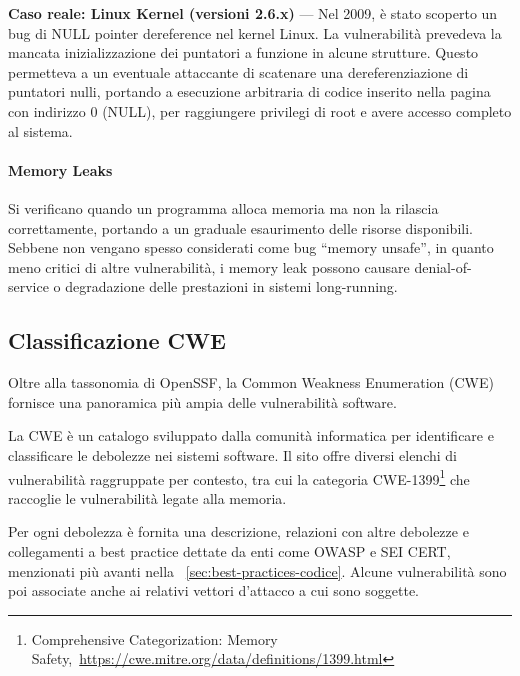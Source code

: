 \textbf{Caso reale: Linux Kernel (versioni 2.6.x)} — Nel 2009, è stato scoperto
un bug di NULL pointer dereference nel kernel Linux. La vulnerabilità prevedeva la
mancata inizializzazione dei puntatori a funzione in alcune strutture. Questo
permetteva a un eventuale attaccante di scatenare una dereferenziazione di
puntatori nulli, portando a esecuzione arbitraria di codice inserito nella pagina
con indirizzo 0 (NULL), per raggiungere privilegi di root e avere accesso
completo al sistema.~\cite{null_pointer_dereference_linux}

\paragraph{Memory Leaks}
\label{sec:memory_leaks} Si verificano quando un programma alloca memoria ma non
la rilascia correttamente, portando a un graduale esaurimento delle risorse
disponibili. Sebbene non vengano spesso considerati come bug ``memory unsafe'',
in quanto meno critici di altre vulnerabilità, i memory leak possono causare denial-of-service
o degradazione delle prestazioni in sistemi long-running.

\subsection{Classificazione CWE}
Oltre alla tassonomia di OpenSSF, la Common Weakness Enumeration (CWE) fornisce
una panoramica più ampia delle vulnerabilità software.

La CWE è un catalogo sviluppato dalla comunità informatica per identificare e
classificare le debolezze nei sistemi software. Il sito offre diversi elenchi di
vulnerabilità raggruppate per contesto, tra cui la categoria CWE-1399\footnote{Comprehensive
Categorization: Memory Safety,~\url{https://cwe.mitre.org/data/definitions/1399.html}}
che raccoglie le vulnerabilità legate alla memoria.

Per ogni debolezza è fornita una descrizione, relazioni con altre debolezze e
collegamenti a best practice dettate da enti come OWASP e SEI CERT, menzionati più
avanti nella ~\autoref{sec:best-practices-codice}. Alcune vulnerabilità sono poi
associate anche ai relativi vettori d'attacco a cui sono soggette.
